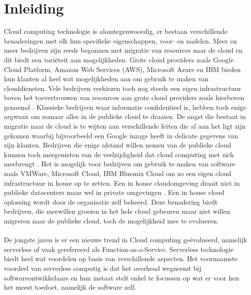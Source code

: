 \chapter{Inleiding}
\label{ch:inleiding}

Cloud computing technologie is alomtegenwoordig, er bestaan verschillende benaderingen met elk hun specifieke eigenschappen, voor- en nadelen. Meer en meer bedrijven zijn reeds begonnen met migratie van resources naar de cloud en dit biedt een variëteit aan mogelijkheden. Grote cloud providers zoals Google Cloud Platform, Amazon Web Services (AWS), Microsoft Azure en IBM bieden hun klanten al heel wat mogelijkheden aan om gebruik te maken van clouddiensten. Vele bedrijven verkiezen toch nog steeds een eigen infrastructuur boven het toevertrouwen van resources aan grote cloud providers zoals hierboven genoemd . Klassieke bedrijven waar informatie confidentieel is, hebben toch enige argwaan om zomaar alles in de publieke cloud te draaien. De angst die bestaat in migratie naar de cloud is te wijten aan verschillende feiten die al aan het ligt zijn gekomen waarbij bijvoorbeeld een Google inzage heeft in delicate gegevens van zijn klanten. Bedrijven die enige afstand willen nemen van de publieke cloud kunnen toch meegenieten van de veelzijdigheid dat cloud computing met zich meebrengt . Het is mogelijk voor bedrijven om gebruik te maken van software zoals VMWare, Microsoft Cloud, IBM Bluemix Cloud om zo een eigen cloud infrastructuur in house op te zetten. Een in house cloudomgeving draait niet in publieke datacenters maar wel in private omgevingen . Een in house cloud oplossing wordt door de organisatie zelf beheerd. Deze benadering biedt bedrijven, die meewillen groeien in het hele cloud gebeuren maar niet willen migreren naar de publieke cloud, toch de mogelijkheid mee te evolueren.
\\\\
De jongste jaren is er een nieuwe trend in Cloud computing geëvolueerd, namelijk serverless of vaak gerefereerd als Function-as-a-Service. Serverless technologie biedt heel wat voordelen op basis van verschillende aspecten. Het voornaamste voordeel van serverless computig is dat het overhead wegneemt bij softwareontwikkelaars en hun instaat stelt enkel te focussen op wat er voor hen het meest toedoet, namelijk de software zelf.
\\\\
